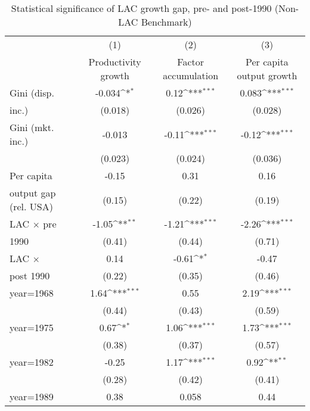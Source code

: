 \begin{sidewaystable}[htbp]\centering
\def\sym#1{\ifmmode^{#1}\else\(^{#1}\)\fi}
\caption{Statistical significance of LAC growth gap, pre- and post-1990 (Non-LAC Benchmark)}
\begin{tabular}{l*{3}{c}}
\toprule
                &\multicolumn{1}{c}{(1)}&\multicolumn{1}{c}{(2)}&\multicolumn{1}{c}{(3)}\\
                &\multicolumn{1}{c}{Productivity growth}&\multicolumn{1}{c}{Factor accumulation}&\multicolumn{1}{c}{Per capita output growth}\\
\midrule
Gini (disp.     &   -0.034\sym{*}  &     0.12\sym{***}&    0.083\sym{***}\\
inc.)           &  (0.018)         &  (0.026)         &  (0.028)         \\
\addlinespace
Gini (mkt. inc.)&   -0.013         &    -0.11\sym{***}&    -0.12\sym{***}\\
                &  (0.023)         &  (0.024)         &  (0.036)         \\
\addlinespace
Per capita      &    -0.15         &     0.31         &     0.16         \\
output gap (rel. USA)&   (0.15)         &   (0.22)         &   (0.19)         \\
\addlinespace
LAC $\times$ pre&    -1.05\sym{**} &    -1.21\sym{***}&    -2.26\sym{***}\\
1990            &   (0.41)         &   (0.44)         &   (0.71)         \\
\addlinespace
LAC $\times$    &     0.14         &    -0.61\sym{*}  &    -0.47         \\
post 1990       &   (0.22)         &   (0.35)         &   (0.46)         \\
\addlinespace
year=1968       &     1.64\sym{***}&     0.55         &     2.19\sym{***}\\
                &   (0.44)         &   (0.43)         &   (0.59)         \\
\addlinespace
year=1975       &     0.67\sym{*}  &     1.06\sym{***}&     1.73\sym{***}\\
                &   (0.38)         &   (0.37)         &   (0.57)         \\
\addlinespace
year=1982       &    -0.25         &     1.17\sym{***}&     0.92\sym{**} \\
                &   (0.28)         &   (0.42)         &   (0.41)         \\
\addlinespace
year=1989       &     0.38         &    0.058         &     0.44         \\

\end{tabular}
\end{sidewaystable}
